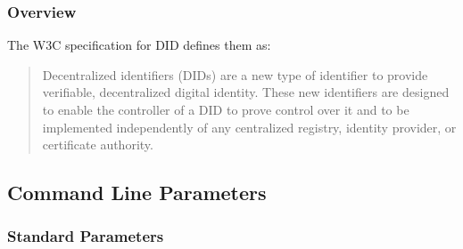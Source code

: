 \documentclass[
]{article}
\begin{document}
\hypertarget{overview}{%
\subsubsection{Overview}\label{overview}}

The W3C specification for DID defines them as:

\begin{quote}
Decentralized identifiers (DIDs) are a new type of identifier to provide
verifiable, decentralized digital identity. These new identifiers are
designed to enable the controller of a DID to prove control over it and
to be implemented independently of any centralized registry, identity
provider, or certificate authority.
\end{quote}

\hypertarget{command-line-parameters}{%
\subsection{Command Line Parameters}\label{command-line-parameters}}

\hypertarget{standard-parameters}{%
\subsubsection{Standard Parameters}\label{standard-parameters}}
\end{document}
